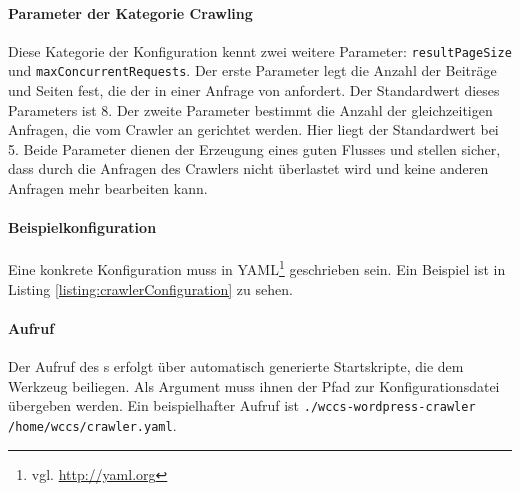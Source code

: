     \paragraph{Parameter der Kategorie Crawling}
    Diese Kategorie der Konfiguration kennt zwei weitere Parameter:
    \texttt{resultPageSize} und \texttt{maxConcurrentRequests}.
    Der erste Parameter legt die Anzahl der Beiträge und Seiten fest,
    die der {\wordpressCrawler} in einer Anfrage von {\wordpress} anfordert.
    Der Standardwert dieses Parameters ist 8.
    Der zweite Parameter bestimmt die Anzahl der gleichzeitigen Anfragen,
    die vom Crawler an {\wordpress} gerichtet werden.
    Hier liegt der Standardwert bei 5.
    Beide Parameter dienen der Erzeugung eines guten Flusses und stellen sicher,
    dass {\wordpress} durch die Anfragen des Crawlers
    nicht überlastet wird und keine anderen Anfragen mehr bearbeiten kann.

    \paragraph{Beispielkonfiguration}
    Eine konkrete Konfiguration muss in YAML\footnote{vgl. \url{http://yaml.org}} geschrieben sein.
    Ein Beispiel ist in Listing \ref{listing:crawlerConfiguration} zu sehen.

    

    \paragraph{Aufruf}
    Der Aufruf des {\wordpressCrawler}s erfolgt über automatisch generierte Startskripte,
    die dem Werkzeug beiliegen.
    Als Argument muss ihnen der Pfad zur Konfigurationsdatei übergeben werden.
    Ein beispielhafter Aufruf ist \texttt{./wccs-wordpress-crawler /home/wccs/crawler.yaml}.
